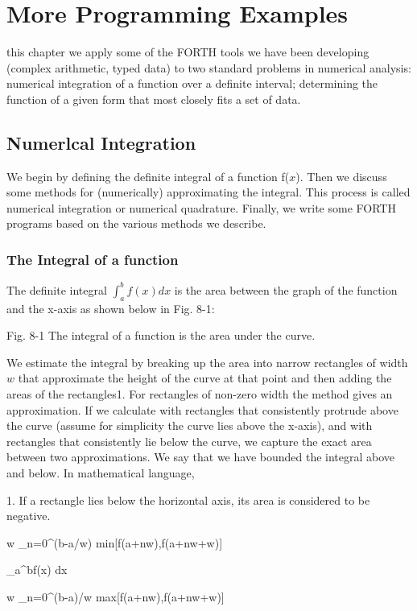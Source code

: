 \chapter{More Programming Examples}
\startcontents[chapters]

 this chapter we apply some of the FORTH tools we have been developing (complex arithmetic, typed data) to two standard problems in numerical analysis: numerical integration of a function over a deﬁnite interval; determining the function of a given form that most closely fits a set of data.

\section{Numerlcal Integration}
We begin by defining the definite integral of a function f($x$). Then we discuss some methods for (numerically) approximating the integral. This process is called numerical integration or numerical quadrature. Finally, we write some FORTH programs based on the various methods we describe.

\subsection{The Integral of a function}
The deﬁnite integral $\int_{a}^{b}f(x) dx$ is the area between the graph of the function and the x-axis as shown below in Fig. 8-1:

Fig. 8-1 The integral of a function is the area under the curve.

We estimate the integral by breaking up the area into narrow
rectangles of width $w$ that approximate the height of the curve at that point and then adding the areas of the rectangles1. For rectangles of non-zero width the method gives an approximation. If we calculate with rectangles that consistently protrude above the curve (assume for simplicity the curve lies above the x-axis), and with rectangles that consistently lie below the curve, we capture the exact area between two approximations. We say that we have bounded the integral above and below. In mathematical language,

1. If a rectangle lies below the horizontal axis, its area is considered to be negative.

w \sum_{n=0}^{(b-a/w)} min[f(a+nw),f(a+nw+w)]

\lt \int_{a}^{b}f(x) dx

\lt w \sum_{n=0}^{(b-a)/w} max[f(a+nw),f(a+nw+w)]

